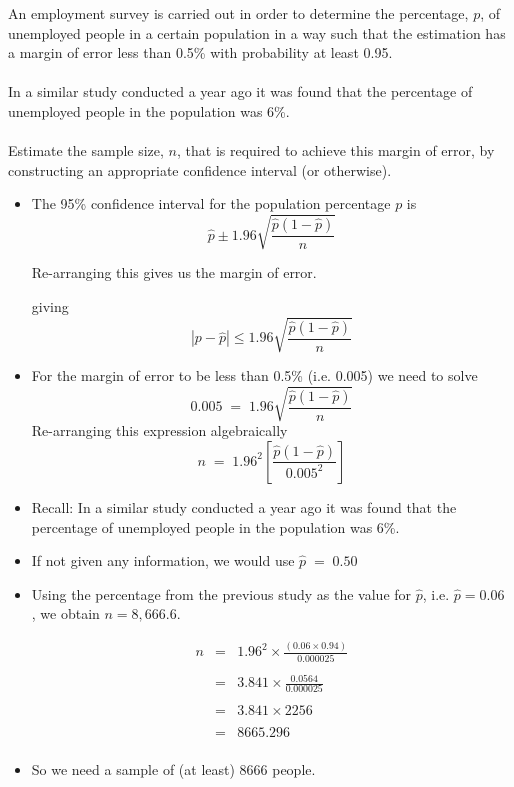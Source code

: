 \documentclass[a4paper,12pt]{article}
\begin{document}
	\large
	\noindent An employment survey is carried out in order to determine the percentage, $p$, of
	unemployed people in a certain population in a way such that the estimation has a margin of error less than 0.5\% with probability at least 0.95. \\ \\
	\noindent In a similar study conducted a year ago it was found that the percentage of unemployed people in the
	population was 6\%.\\\\
	 Estimate the sample size, $n$, that is required to achieve this margin of error, by
	constructing an appropriate confidence interval (or otherwise).
	
	
	
	\begin{itemize}
		\item The 95\% confidence interval for the population percentage ${p}$ is
		\[ \hat{p} \pm 1.96 \sqrt{ \frac{ \hat{p} (1 - \hat{p} )}{n}}\]
		
		Re-arranging this gives us the margin of error.
		
		giving 
		\[| p - \hat{p} | \leq 1.96\sqrt{ \frac{ \hat{p} (1 - \hat{p} )}{n}}
		\]
		\item For the margin of error to be less than 0.5\% (i.e. 0.005) we need to solve
		\[0.005 \;=\; 1.96 \sqrt{ \frac{ \hat{p} (1 - \hat{p} )}{n}} \]
		Re-arranging this expression algebraically
		\[ n \;=\; 1.96^2 \left[ \frac{ \hat{p} (1 - \hat{p} )} {0.005^2} \right] \]
		
		\item Recall: In a similar study
		conducted a year ago it was found that the percentage of unemployed people in the
		population was 6\%.
		\item If not given any information, we would use $\hat{p} \;=\; 0.50$
		\medskip 
		\item Using the percentage from the previous study as the value for $\hat{p}$, i.e. $\hat{p} = 0.06$ , we obtain $n = 8,666.6$.
		
		\begin{eqnarray*} 
			n &=& 1.96^2 \times \frac{ (0.06 \times 0.94 )}{0.000025} \\
			& & \\
			&=& 3.841 \times \frac{0.0564}{0.000025}\\
			& & \\
			&=& 3.841 \times 2256 \\
			& & \\
			&=& 8665.296 \\
		\end{eqnarray*}
		
		\item So we need a sample of (at least) 8666 people.
	\end{itemize}
	
	
	
\end{document}

